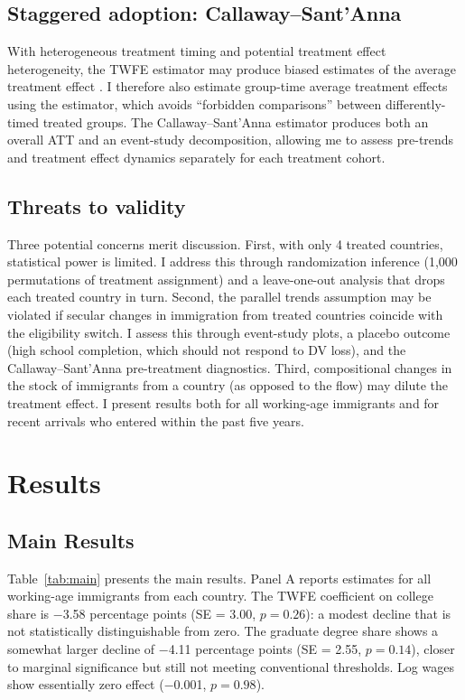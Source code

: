 \documentclass[12pt]{article}
\begin{document}
\subsection{Staggered adoption: Callaway--Sant'Anna}

With heterogeneous treatment timing and potential treatment effect heterogeneity, the TWFE estimator may produce biased estimates of the average treatment effect \citep{GoodmanBacon2021}. I therefore also estimate group-time average treatment effects using the \citet{CallawayS2021} estimator, which avoids ``forbidden comparisons'' between differently-timed treated groups. The Callaway--Sant'Anna estimator produces both an overall ATT and an event-study decomposition, allowing me to assess pre-trends and treatment effect dynamics separately for each treatment cohort.

\subsection{Threats to validity}

Three potential concerns merit discussion. First, with only 4 treated countries, statistical power is limited. I address this through randomization inference (1,000 permutations of treatment assignment) and a leave-one-out analysis that drops each treated country in turn. Second, the parallel trends assumption may be violated if secular changes in immigration from treated countries coincide with the eligibility switch. I assess this through event-study plots, a placebo outcome (high school completion, which should not respond to DV loss), and the Callaway--Sant'Anna pre-treatment diagnostics. Third, compositional changes in the stock of immigrants from a country (as opposed to the flow) may dilute the treatment effect. I present results both for all working-age immigrants and for recent arrivals who entered within the past five years.

\section{Results}

\subsection{Main Results}



Table~\ref{tab:main} presents the main results. Panel A reports estimates for all working-age immigrants from each country. The TWFE coefficient on college share is $-$3.58 percentage points (SE = 3.00, $p = 0.26$): a modest decline that is not statistically distinguishable from zero. The graduate degree share shows a somewhat larger decline of $-$4.11 percentage points (SE = 2.55, $p = 0.14$), closer to marginal significance but still not meeting conventional thresholds. Log wages show essentially zero effect ($-$0.001, $p = 0.98$).
\end{document}
